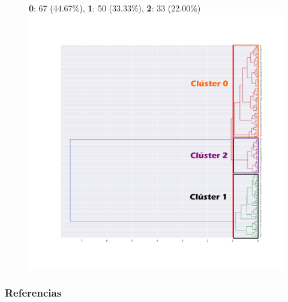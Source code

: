 \documentclass[spanish]{beamer}
\begin{document}
\begin{frame}
\begin{figure}[h]
\centering
\textbf{0}: 67 (44.67\%), \textbf{1}: 50 (33.33\%), \textbf{2}: 33 (22.00\%)
\includegraphics[scale=0.23]{dani/dendrogramcolor.png}
\end{figure}
\end{frame}



\begin{frame}
  \frametitle{Referencias}
        
        
\end{frame}
\end{document}

